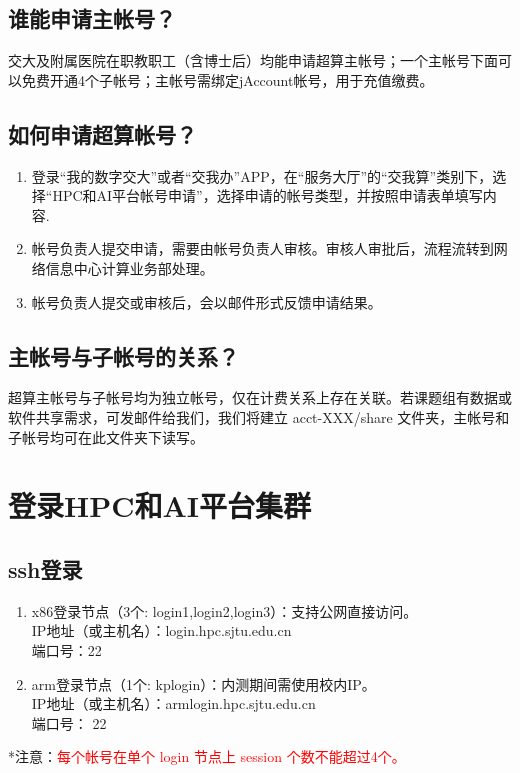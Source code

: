 \documentclass[cn, 12pt, hang, black, chinese]{elegantbook}
\begin{document}
\subsection*{谁能申请主帐号？}
交大及附属医院在职教职工（含博士后）均能申请超算主帐号；一个主帐号下面可以免费开通4个子帐号；主帐号需绑定jAccount帐号，用于充值缴费。

\subsection*{如何申请超算帐号？}
\begin{enumerate}
\item 登录“我的数字交大”或者“交我办”APP，在“服务大厅”的“交我算”类别下，选择“HPC和AI平台帐号申请”，选择申请的帐号类型，并按照申请表单填写内容.
\item 帐号负责人提交申请，需要由帐号负责人审核。审核人审批后，流程流转到网络信息中心计算业务部处理。
\item 帐号负责人提交或审核后，会以邮件形式反馈申请结果。
\end{enumerate}

\subsection*{主帐号与子帐号的关系？}
超算主帐号与子帐号均为独立帐号，仅在计费关系上存在关联。若课题组有数据或软件共享需求，可发邮件给我们，我们将建立 acct-XXX/share 文件夹，主帐号和子帐号均可在此文件夹下读写。

\section{登录HPC和AI平台集群}

\subsection*{ssh登录}
\begin{enumerate}
\item x86登录节点（3个: login1,login2,login3）：支持公网直接访问。\\IP地址（或主机名）：login.hpc.sjtu.edu.cn\\端口号：22
\item arm登录节点（1个: kplogin）：内测期间需使用校内IP。\\IP地址（或主机名）：armlogin.hpc.sjtu.edu.cn\\端口号： 22
\end{enumerate}
*注意：\textcolor{red}{每个帐号在单个 login 节点上 session 个数不能超过4个。}
\end{document}
